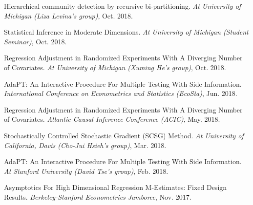 \documentclass{article}
\begin{document}
\vspace{2mm}
Hierarchical community detection by recursive bi-partitioning. \emph{At University of Michigan (Liza Levina's group)}, Oct. 2018.

\vspace{2mm}
Statistical Inference in Moderate Dimensions. \emph{At University of Michigan (Student Seminar)}, Oct. 2018.

\vspace{2mm}
Regression Adjustment in Randomized Experiments With A Diverging Number of Covariates. \emph{At University of Michigan (Xuming He's group)}, Oct. 2018.

\vspace{2mm}
AdaPT: An Interactive Procedure For Multiple Testing With Side Information. \emph{International Conference on Econometrics and Statistics (EcoSta)}, Jun. 2018.

\vspace{2mm}
Regression Adjustment in Randomized Experiments With A Diverging Number of Covariates. \emph{Atlantic Causal Inference Conference (ACIC)}, May. 2018.

\vspace{2mm}
Stochastically Controlled Stochastic Gradient (SCSG) Method. \emph{At University of California, Davis (Cho-Jui Hsieh's group)}, Mar. 2018.

\vspace{2mm}
AdaPT: An Interactive Procedure For Multiple Testing With Side Information. \emph{At Stanford University (David Tse's group)}, Feb. 2018.

\vspace{2mm}
Asymptotics For High Dimensional Regression M-Estimates: Fixed Design Results. \emph{Berkeley-Stanford Econometrics Jamboree}, Nov. 2017. 

\vspace{5mm}




\end{document}
